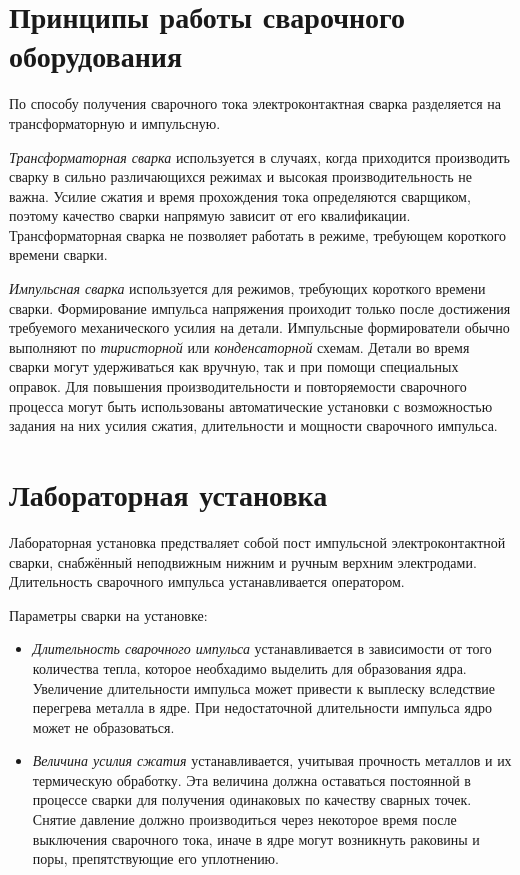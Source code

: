 \documentclass[12pt]{article}
\begin{document}
\section{Принципы работы сварочного оборудования}
По способу получения сварочного тока электроконтактная сварка разделяется на трансформаторную и импульсную. \par
{\it Трансформаторная сварка} используется в случаях, когда приходится производить сварку в сильно различающихся режимах и высокая производительность не важна. Усилие сжатия и время прохождения тока определяются сварщиком, поэтому качество сварки напрямую зависит от его квалификации. Трансформаторная сварка не позволяет работать в режиме, требующем короткого времени сварки. \par 
{\it Импульсная сварка} используется для режимов, требующих короткого времени сварки. Формирование импульса напряжения проиходит только после достижения требуемого механического усилия на детали. Импульсные формирователи обычно выполняют по {\it тиристорной} или {\it конденсаторной} схемам. Детали во время сварки могут удерживаться как вручную, так и при помощи специальных оправок. Для повышения производительности и повторяемости сварочного процесса могут быть использованы автоматические установки с возможностью задания на них усилия сжатия, длительности и мощности сварочного импульса.  

\section{Лабораторная установка}

Лабораторная установка предстваляет собой пост импульсной электроконтактной сварки, снабжённый неподвижным нижним и ручным верхним электродами. Длительность сварочного импульса устанавливается оператором. \par 
Параметры сварки на установке:
\begin{itemize}
    \item {\it Длительность сварочного импульса} устанавливается в зависимости от того количества тепла, которое необхадимо выделить для образования ядра. Увеличение длительности импульса может привести к выплеску вследствие перегрева металла в ядре. При недостаточной длительности импульса ядро может не образоваться.
    \item {\it Величина усилия сжатия} устанавливается, учитывая прочность металлов и их термическую обработку. Эта величина должна оставаться постоянной в процессе сварки для получения одинаковых по качеству сварных точек. Снятие давление должно производиться через некоторое время после выключения сварочного тока, иначе в ядре могут возникнуть раковины и поры, препятствующие его уплотнению.
\end{itemize}
\end{document}
